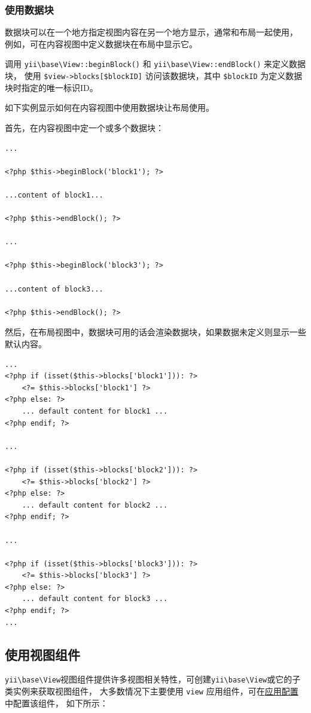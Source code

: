 \subsubsection{使用数据块 \label{structure-views.md::using-blocks}}
数据块可以在一个地方指定视图内容在另一个地方显示，通常和布局一起使用，
例如，可在内容视图中定义数据块在布局中显示它。

调用 \texttt{yii{\allowbreak{}\textbackslash}base{\allowbreak{}\textbackslash}View\allowbreak{}::\allowbreak{}beginBlock()} 和 \texttt{yii{\allowbreak{}\textbackslash}base{\allowbreak{}\textbackslash}View\allowbreak{}::\allowbreak{}endBlock()} 来定义数据块，
使用 \lstinline|$view->blocks[$blockID]| 访问该数据块，其中 \lstinline|$blockID| 为定义数据块时指定的唯一标识ID。

如下实例显示如何在内容视图中使用数据块让布局使用。

首先，在内容视图中定一个或多个数据块：

\lstset{language=php}\begin{lstlisting}
...

<?php $this->beginBlock('block1'); ?>

...content of block1...

<?php $this->endBlock(); ?>

...

<?php $this->beginBlock('block3'); ?>

...content of block3...

<?php $this->endBlock(); ?>
\end{lstlisting}
然后，在布局视图中，数据块可用的话会渲染数据块，如果数据未定义则显示一些默认内容。

\lstset{language=php}\begin{lstlisting}
...
<?php if (isset($this->blocks['block1'])): ?>
    <?= $this->blocks['block1'] ?>
<?php else: ?>
    ... default content for block1 ...
<?php endif; ?>

...

<?php if (isset($this->blocks['block2'])): ?>
    <?= $this->blocks['block2'] ?>
<?php else: ?>
    ... default content for block2 ...
<?php endif; ?>

...

<?php if (isset($this->blocks['block3'])): ?>
    <?= $this->blocks['block3'] ?>
<?php else: ?>
    ... default content for block3 ...
<?php endif; ?>
...
\end{lstlisting}
\subsection{使用视图组件 \label{structure-views.md::using-view-components}}
\texttt{yii{\allowbreak{}\textbackslash}base{\allowbreak{}\textbackslash}View}视图组件提供许多视图相关特性，可创建\texttt{yii{\allowbreak{}\textbackslash}base{\allowbreak{}\textbackslash}View}或它的子类实例来获取视图组件，
大多数情况下主要使用 \lstinline|view| 应用组件，可在\hyperref[structure-applications.md::application-configurations]{应用配置}中配置该组件，
如下所示：


